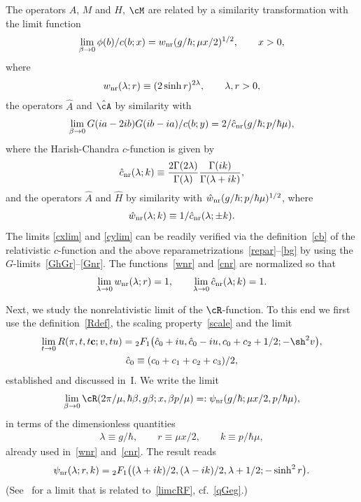 \documentclass[pdftex]{sigma}
\numberwithin{equation}{section}
\begin{document}
The operators $A$, $M$ and $H$, $\cM$ are related by a similarity transformation with the limit function
\begin{gather}\label{cxlim}
\lim_{\beta \to 0}\phi(b)/c(b;x) =w_{\rm nr}(g/\hbar;\mu x/2)^{1/2},\qquad x>0,
\end{gather}
where
\begin{gather}\label{wnr}
w_{\rm nr}(\lambda;r)\equiv (2\sinh r)^{2\lambda},\qquad \lambda,r>0,
\end{gather}
the operators $\hat{A}$ and $\hat{\cA}$ by similarity with
\begin{gather}\label{cylim}
\lim_{\beta \to 0}G(ia-2ib)G(ib-ia)/c(b;y)=2/\hat{c}_{\rm nr}(g/\hbar;p/\hbar\mu),
\end{gather}
where the Harish-Chandra $c$-function is given by
\begin{gather}\label{cnr}
 \hat{c}_{\rm nr}(\lambda;k)\equiv \frac{2\Gamma(2\lambda)}{\Gamma(\lambda)}\frac{\Gamma(ik)}{\Gamma(\lambda+ik)},
 \end{gather}
and the operators $\hat{A}$ and $\hat{H}$ by similarity with
$\hat{w}_{\rm nr}(g/\hbar;p/\hbar\mu)^{1/2}$, where
\begin{gather}
\hat{w}_{\rm nr}(\lambda;k)\equiv 1/ \hat{c}_{\rm nr}(\lambda;\pm k).
\end{gather}
The limits \eqref{cxlim} and \eqref{cylim} can be readily verif\/ied via the def\/inition~\eqref{cb} of the relativistic $c$-function and the above reparametrizations~\eqref{repar}--\eqref{bg} by using the $G$-limits~\eqref{GhGr}--\eqref{Gnr}. The functions~\eqref{wnr} and \eqref{cnr} are normalized so that
\begin{gather}\label{cwnorm}
\lim_{\lambda\to 0}w_{\rm nr}(\lambda;r)=1,\qquad
\lim_{\lambda\to 0}\hat{c}_{\rm nr}(\lambda;k)=1.
\end{gather}

Next, we study the nonrelativistic limit of the $\cR$-function. To this end we f\/irst use the def\/inition~\eqref{Rdef}, the scaling property~\eqref{scale} and the limit
\begin{gather}\label{limRF}
\lim_{t \to 0}R(\pi,t,t {\bf c};v,t
u)={}_2F_1\big(\hat{c}_0+iu,\hat{c}_0-iu,c_0+c_2+1/2;-\sh^2v\big),
\\
\hat{c}_0\equiv (c_0+c_1+c_2+c_3)/2,
\end{gather}
established and discussed in~I. We write the limit
\begin{gather}\label{limcRF}
\lim_{\beta \to 0}\cR(2\pi/\mu,\hbar\beta,g\beta;x,\beta p/\mu)=:\psi_{\rm nr}(g/\hbar;\mu x/2,p/\hbar\mu),
\end{gather}
in terms of the dimensionless quantities
\begin{gather}\label{dless}
\lambda \equiv g/\hbar,\qquad  r\equiv \mu x/2,\qquad k\equiv p/\hbar\mu,
\end{gather}
already used in~\eqref{wnr} and~\eqref{cnr}. The result reads{\samepage
\begin{gather}\label{psi1}
\psi_{\rm nr}(\lambda;r,k)={}_2F_1\big((\lambda+ik)/2,(\lambda-ik)/2,\lambda +1/2;-\sinh^2 r\big).
\end{gather}
(See~\cite{koo} for a limit that is related to~\eqref{limcRF}, cf.~\eqref{qGeg}.)}
\end{document}
